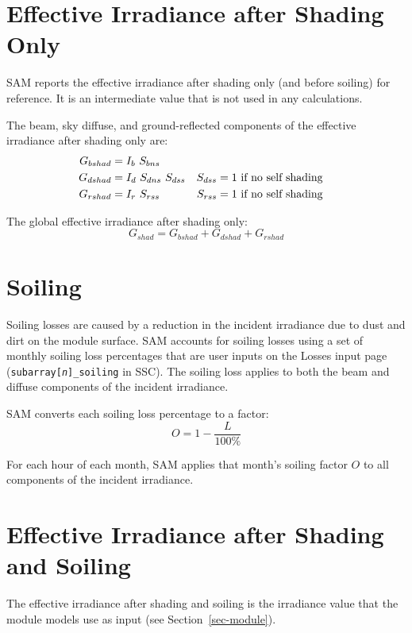 \documentclass[12pt,letterpaper]{article}
\begin{document}
\section{Effective Irradiance after Shading Only}

SAM reports the effective irradiance after shading only (and before soiling) for reference. It is an intermediate value that is not used in any calculations.

The beam, sky diffuse, and ground-reflected components of the effective irradiance after shading only are:
\begin{align}
G_{bshad} &= I_b~S_{bns}\notag\\
G_{dshad} &= I_d~S_{dns}~S_{dss} & S_{dss}&=1 ~\text{if no self shading} \notag\\
G_{rshad} &= I_r~S_{rss} & S_{rss}&=1 ~\text{if no self shading}
\end{align}

The global effective irradiance after shading only:
\begin{equation}
G_{shad} = G_{bshad} + G_{dshad} + G_{rshad}
\end{equation}

\section{Soiling}\label{sec-soiling}

Soiling losses are caused by a reduction in the incident irradiance due to dust and dirt on the module surface. SAM accounts for soiling losses using a set of monthly soiling loss percentages that are user inputs on the Losses input page (\texttt{subarray[\textit{n}]\_soiling} in SSC). The soiling loss applies to both the beam and diffuse components of the incident irradiance.

SAM converts each soiling loss percentage to a factor:
\begin{equation}
O=1-\frac{L}{100\%}
\end{equation}

For each hour of each month, SAM applies that month's soiling factor $O$ to all components of the incident irradiance.

\section{Effective Irradiance after Shading and Soiling}

The effective irradiance after shading and soiling is the irradiance value that the module models use as input (see Section~\ref{sec-module}).
\end{document}
